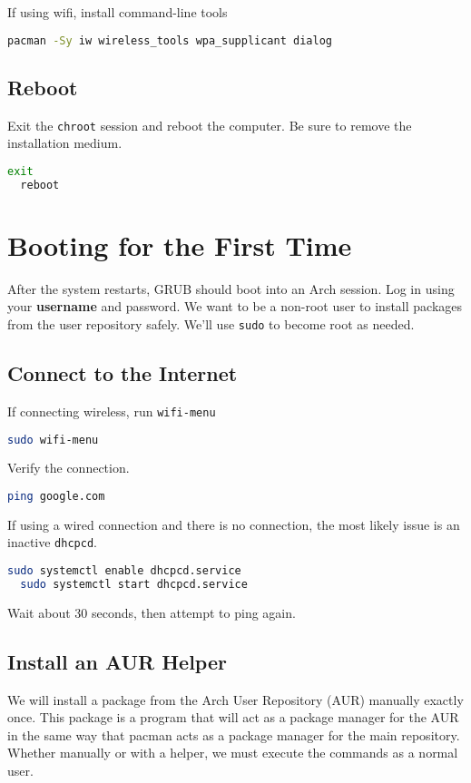 \documentclass[letterpaper,12pt]{article}
\newcommand{\p}{\par\bigskip}
\begin{document}
If using wifi, install command-line tools
\begin{lstlisting}[language=bash]
  pacman -Sy iw wireless_tools wpa_supplicant dialog
\end{lstlisting} \p

\subsection{Reboot}
Exit the {\tt chroot} session and reboot the computer. Be sure to remove the installation medium.
\begin{lstlisting}[language=bash]
  exit
  reboot
\end{lstlisting}


\section{Booting for the First Time}
After the system restarts, GRUB should boot into an Arch session. Log in using your {\bf username} and password. We want to be a non-root user to install packages from the user repository safely. We'll use {\tt sudo} to become root as needed.

\subsection{Connect to the Internet}
If connecting wireless, run {\tt wifi-menu}
\begin{lstlisting}[language=bash]
  sudo wifi-menu
\end{lstlisting} \p

Verify the connection.
\begin{lstlisting}[language=bash]
  ping google.com
\end{lstlisting} \p

If using a wired connection and there is no connection, the most likely issue is an inactive {\tt dhcpcd}.
\begin{lstlisting}[language=bash]
  sudo systemctl enable dhcpcd.service
  sudo systemctl start dhcpcd.service
\end{lstlisting} \p

Wait about 30 seconds, then attempt to ping again.

\subsection{Install an AUR Helper}
We will install a package from the Arch User Repository (AUR) manually exactly once. This package is a program that will act as a package manager for the AUR in the same way that pacman acts as a package manager for the main repository. Whether manually or with a helper, we must execute the commands as a normal user. \p
\end{document}
